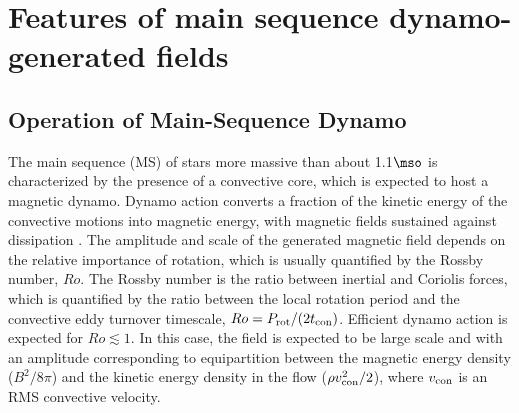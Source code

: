 \section{Features of main sequence dynamo-generated fields}
\label{dynamo}

\subsection{Operation of Main-Sequence Dynamo}\label{msdynamo}

The main sequence (MS) of stars more massive than about 1.1$\mso$ is characterized by the presence of a convective core,
which is expected to host a magnetic dynamo. Dynamo action converts a fraction of the kinetic energy 
of the convective motions into magnetic energy, with magnetic fields sustained against dissipation  \citep[see e.g.,][]{Brandenburg_2005}. The amplitude and scale of the generated magnetic field depends on the relative importance of rotation, which is usually quantified by the Rossby number, $Ro$. The Rossby number is the ratio between inertial and Coriolis forces, which is quantified by the ratio between the local rotation period and the convective eddy turnover timescale, $Ro = P_{\rm rot}/(2 t_{\rm con})$. 
Efficient dynamo action is expected for $Ro \lesssim 1$. In this case, the field is expected to be large scale and with an amplitude corresponding to equipartition between the magnetic energy density ($B^2/8\pi$) and the kinetic energy density in the flow ($\rho v^2_{\rm con}/2$), where $v_{\rm con}$ is an RMS convective velocity.

